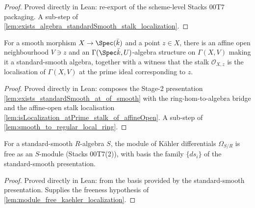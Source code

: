 \begin{proof}
  Proved directly in Lean: re-export of the scheme-level Stacks 00T7 packaging.
  A sub-step of \cref{lem:exists_algebra_standardSmooth_stalk_localization}.
\end{proof}

\begin{lemma}
  \label{lem:exists_algebra_standardSmooth_stalk_localization}
  For a smooth morphism \(X \to \Spec(\bar k)\) and a point \(z \in X\), there is
  an affine open neighbourhood \(V \ni z\) and an \(\Gamma(\Spec \bar k, U)\)-algebra
  structure on \(\Gamma(X, V)\) making it a standard-smooth algebra, together with a
  witness that the stalk \(\mathcal O_{X, z}\) is the localisation of \(\Gamma(X, V)\)
  at the prime ideal corresponding to \(z\).
\end{lemma}

\begin{proof}
  Proved directly in Lean: composes the Stage-2 presentation
  \cref{lem:exists_standardSmooth_at_of_smooth} with the ring-hom-to-algebra bridge
  and the affine-open stalk localisation
  \cref{lem:isLocalization_atPrime_stalk_of_affineOpen}. A sub-step of
  \cref{lem:smooth_to_regular_local_ring}.
\end{proof}

\begin{lemma}
  \label{lem:module_free_kaehler_standardSmooth}
  For a standard-smooth \(R\)-algebra \(S\), the module of K\"ahler differentials
  \(\Omega_{S/R}\) is free as an \(S\)-module (Stacks 00T7(2)), with basis the family
  \(\{ds_i\}\) of the standard-smooth presentation.
\end{lemma}

\begin{proof}
  Proved directly in Lean: from the basis provided by the standard-smooth
  presentation. Supplies the freeness hypothesis of
  \cref{lem:module_free_kaehler_localization}.
\end{proof}

